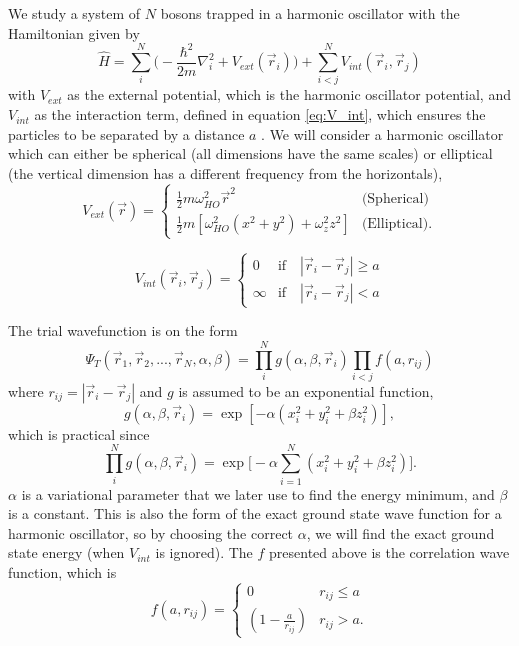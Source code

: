 \documentclass[norsk,a4paper,12pt]{article}
\begin{document}
We study a system of $N$ bosons trapped in a harmonic oscillator with the Hamiltonian given by 
\begin{equation}
\hat{H}=\sum_i^N\bigg(-\frac{\hbar^2}{2m}\nabla_i^2+V_{ext}(\vec{r}_i)\bigg)+\sum_{i<j}^NV_{int}(\vec{r}_i,\vec{r}_j)
\label{eq:Hamilton}
\end{equation}
with $V_{ext}$ as the external potential, which is the harmonic oscillator potential,
and $V_{int}$ as the interaction term, defined in equation \ref{eq:V_int}, which ensures the particles to be separated by a distance $a$ . We will consider a harmonic oscillator which can either be spherical (all dimensions have the same scales) or elliptical (the vertical dimension has a different frequency from the horizontals),
\begin{equation}
\label{eq:V_ext}
V_{ext}(\vec{r})=
\begin{cases} 
   \frac{1}{2}m\omega_{HO}^2\vec{r}^2 & \text{(Spherical)} \\
   \frac{1}{2}m[\omega_{HO}^2(x^2 + y^2) + \omega_z^2z^2] & \text{(Elliptical)}.
\end{cases}
\end{equation}

\begin{equation}
\label{eq:V_int}
V_{int}(\vec{r}_i, \vec{r}_j)=
\begin{cases} 
0 & \text{if}\quad |\vec{r}_i-\vec{r}_j| \geq a \\
\infty & \text{if}\quad |\vec{r}_i-\vec{r}_j| < a
\end{cases}
\end{equation}

The trial wavefunction is on the form 
\begin{equation}
\Psi_T(\vec{r}_1, \vec{r}_2, ..., \vec{r}_N, \alpha, \beta)=\prod_i^Ng(\alpha, \beta, \vec{r}_i)\prod_{i<j}f(a,r_{ij})
\label{eq:WF}
\end{equation}
where $r_{ij}=|\vec{r}_i-\vec{r}_j|$ and $g$ is assumed to be an exponential function,
\begin{equation}
g(\alpha, \beta, \vec{r}_i)=\exp[-\alpha(x_i^2+y_i^2+\beta z_i^2)],
\end{equation}
which is practical since
\begin{equation}
\prod_i^Ng(\alpha, \beta, \vec{r}_i)=\exp\Big[-\alpha\sum_{i=1}^N(x_i^2+y_i^2+\beta z_i^2)\Big].
\end{equation}
$\alpha$ is a variational parameter that we later use to find the energy minimum, and $\beta$ is a constant. This is also the form of the exact ground state wave function for a harmonic oscillator, so by choosing the correct $\alpha$, we will find the exact ground state energy (when $V_{int}$ is ignored). The $f$ presented above is the correlation wave function, which is 
\begin{equation}
\label{eq:WF_interaction_part}
f(a,r_{ij})=
\begin{cases} 
   0 & r_{ij} \leq a \\
   \left(1-\frac{a}{r_{ij}}\right) & r_{ij} > a.
\end{cases}
\end{equation}
\end{document}
